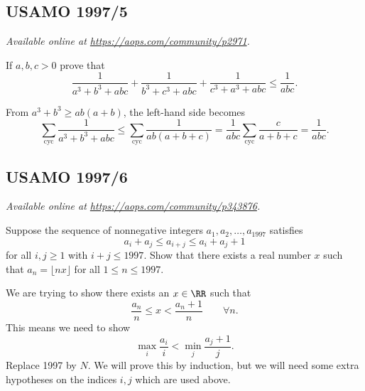 \documentclass[11pt]{scrartcl}
\begin{document}
\subsection{USAMO 1997/5}
\textsl{Available online at \url{https://aops.com/community/p2971}.}
\begin{mdframed}[style=mdpurplebox,frametitle={Problem statement}]
If $a,b,c > 0$ prove that
\[
  \frac{1}{a^3+b^3+abc}
  + \frac{1}{b^3+c^3+abc}
  + \frac{1}{c^3+a^3+abc}
  \le \frac{1}{abc}.
\]
\end{mdframed}
From $a^3 + b^3 \ge ab(a+b)$, the left-hand side becomes
\[
  \sum_{\text{cyc}} \frac{1}{a^3+b^3+abc}
  \le \sum_{\text{cyc}} \frac{1}{ab(a+b+c)}
  = \frac{1}{abc} \sum_{\text{cyc}} \frac{c}{a+b+c}
  = \frac{1}{abc}.
\]
\pagebreak

\subsection{USAMO 1997/6}
\textsl{Available online at \url{https://aops.com/community/p343876}.}
\begin{mdframed}[style=mdpurplebox,frametitle={Problem statement}]
Suppose the sequence of nonnegative integers
$a_1, a_2, \dots, a_{1997}$ satisfies
\[ a_i + a_j \leq a_{i+j} \leq a_i + a_j + 1  \]
for all $i,j \geq 1$ with $i + j \leq 1997$.
Show that there exists a real number $x$ such that
$a_n = \lfloor nx \rfloor$ for all $1 \leq n \leq 1997$.
\end{mdframed}
We are trying to show there exists an $x \in \RR$
such that
\[ \frac{a_n}{n} \le x < \frac{a_n+1}{n} \qquad \forall n. \]
This means we need to show
\[ \max_i \frac{a_i}{i} < \min_j \frac{a_j+1}{j}. \]
Replace 1997 by $N$.
We will prove this by induction,
but we will need some extra hypotheses on the indices $i,j$
which are used above.
\end{document}
